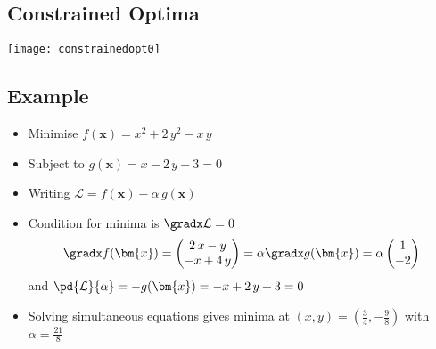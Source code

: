 
\begin{slide}
\section[-2]{Constrained Optima}
\pb
\pause
\begin{center}
  \texttt{[image: constrainedopt0]}
\end{center}
\end{slide}


\begin{slide}
\section[-2]{Example}

\begin{PauseHighLight}
  \begin{itemize}
  \item Minimise $f(\bm{x}) = x^2 + 2\,y^2 - x\,y$
  \item Subject to $g(\bm{x}) = x - 2\,y -3 = 0$\pause
  \item Writing $\mathcal{L} = f(\bm{x}) - \alpha\,g(\bm{x})$\pause
  \item Condition for minima is $\gradx \mathcal{L} = 0$
    \begin{align*}
      \gradx f(\bm{x}) = 
      \begin{pmatrix}
        2\,x -y \\ -x + 4\,y
      \end{pmatrix} =
      \alpha \gradx g(\bm{x}) = \alpha
      \begin{pmatrix}
        1 \\ -2
      \end{pmatrix}
    \end{align*}
    and $\pd{\mathcal{L}}{\alpha} = -g(\bm{x}) = -x + 2\,y +3 = 0$\pause
  \item Solving simultaneous equations gives minima at $(x,y)=(\frac{3}{4}, -
  \frac{9}{8})$ with $\alpha= \frac{21}{8}$\pause
  \end{itemize}
\end{PauseHighLight}

\end{slide}

